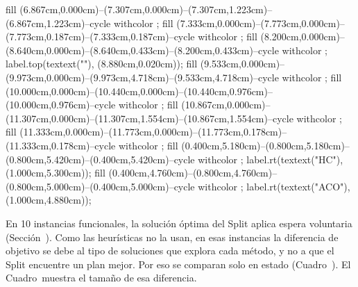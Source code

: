 {fill (6.867cm,0.000cm)--(7.307cm,0.000cm)--(7.307cm,1.223cm)--(6.867cm,1.223cm)--cycle withcolor ;
fill (7.333cm,0.000cm)--(7.773cm,0.000cm)--(7.773cm,0.187cm)--(7.333cm,0.187cm)--cycle withcolor ;
fill (8.200cm,0.000cm)--(8.640cm,0.000cm)--(8.640cm,0.433cm)--(8.200cm,0.433cm)--cycle withcolor ;
label.top(textext(""), (8.880cm,0.020cm));
fill (9.533cm,0.000cm)--(9.973cm,0.000cm)--(9.973cm,4.718cm)--(9.533cm,4.718cm)--cycle withcolor ;
fill (10.000cm,0.000cm)--(10.440cm,0.000cm)--(10.440cm,0.976cm)--(10.000cm,0.976cm)--cycle withcolor ;
fill (10.867cm,0.000cm)--(11.307cm,0.000cm)--(11.307cm,1.554cm)--(10.867cm,1.554cm)--cycle withcolor ;
fill (11.333cm,0.000cm)--(11.773cm,0.000cm)--(11.773cm,0.178cm)--(11.333cm,0.178cm)--cycle withcolor ;
fill (0.400cm,5.180cm)--(0.800cm,5.180cm)--(0.800cm,5.420cm)--(0.400cm,5.420cm)--cycle withcolor ;
label.rt(textext("\tfx HC"), (1.000cm,5.300cm));
fill (0.400cm,4.760cm)--(0.800cm,4.760cm)--(0.800cm,5.000cm)--(0.400cm,5.000cm)--cycle withcolor ;
label.rt(textext("\tfx ACO"), (1.000cm,4.880cm));
\stopMPcode}

\stopsubsection

\startsubsection[title={Instancias con espera voluntaria}, reference=sec:res_espera]

En 10 instancias funcionales, la solución óptima del Split aplica espera
voluntaria (Sección~). Como las heurísticas no la
usan, en esas instancias la diferencia de objetivo se debe al tipo de
soluciones que explora cada método, y no a que el Split encuentre un plan
mejor. Por eso se comparan solo en estado (Cuadro~).
El Cuadro~ muestra el tamaño de esa diferencia.

